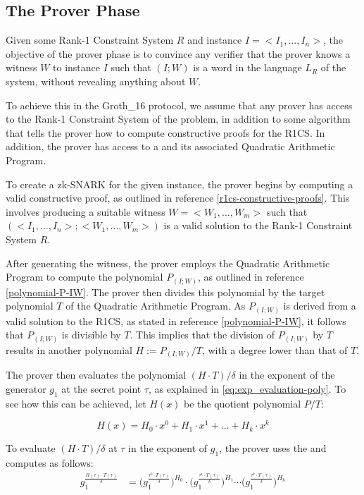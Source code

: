 \subsection{The Prover Phase} Given some Rank-1 Constraint System $R$ and instance $I=<I_1,\ldots, I_n>$, the objective of the prover phase is to convince any verifier that the prover knows a witness $W$ to instance $I$ such that  $(I;W)$ is a word in the language $L_R$ of the system, without revealing anything about $W$. 

To achieve this in the Groth\_16 protocol, we assume that any prover has access to the Rank-1 Constraint System of the problem, in addition to some algorithm that tells the prover how to compute constructive proofs for the R1CS. In addition, the prover has access to a  and its associated Quadratic Arithmetic Program. 

To create a zk-SNARK for the given instance, the prover begins by computing a valid constructive proof, as outlined in reference \ref{r1cs-constructive-proofs}. This involves producing a suitable witness $W=<W_1,\ldots,W_m>$ such that $(<I_1,\ldots, I_n>; <W_1,\ldots,W_m>)$ is a valid solution to the Rank-1 Constraint System $R$. 

After generating the witness, the prover employs the Quadratic Arithmetic Program to compute the polynomial $P_{(I;W)}$, as outlined in reference \ref{polynomial-P-IW}. The prover then divides this polynomial by the target polynomial $T$ of the Quadratic Arithmetic Program. As $P_{(I;W)}$ is derived from a valid solution to the R1CS, as stated in reference \ref{polynomial-P-IW}, it follows that $P_{(I;W)}$ is divisible by $T$. This implies that the division of $P_{(I;W)}$ by $T$ results in another polynomial $H:=P_{(I;W)} / T$, with a degree lower than that of $T$.

The prover then evaluates the polynomial $(H\cdot T)/\delta$ in the exponent of the generator $g_1$ at the secret point $\tau$, as explained in \ref{eq:exp_evaluation-poly}. To see how this can be achieved, let $H(x)$ be the quotient polynomial $P/T$:

\begin{equation}
H(x) = H_0\cdot x^0 + H_1\cdot x^1 +\ldots + H_k \cdot x^k
\end{equation}

To evaluate $(H\cdot T)/\delta$ at $\tau$ in the exponent of $g_1$, the prover uses the  and computes as follows:
\begin{align*}
g_1^{\frac{H(\tau)\cdot T(\tau)}{\delta}} 
 &= \Big(g_1^{\frac{\tau^0\cdot T(\tau)}{\delta}}\Big)^{H_0}\cdot \Big(g_1^{\frac{\tau^1\cdot T(\tau)}{\delta}}\Big)^{H_1}\cdots \Big(g_1^{\frac{\tau^k\cdot T(\tau)}{\delta}}\Big)^{H_k}
\end{align*}

